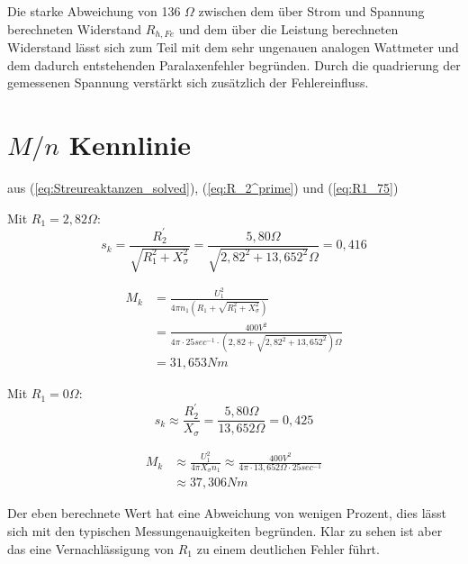 \documentclass[conference]{IEEEtran}
\begin{document}
Die starke Abweichung von 136 $ \Omega$ zwischen dem über Strom und Spannung
berechneten Widerstand $R_{h, Fe}$ und dem über die Leistung berechneten
Widerstand lässt sich zum Teil mit dem sehr ungenauen analogen Wattmeter und
dem dadurch entstehenden Paralaxenfehler begründen. Durch die quadrierung der
gemessenen Spannung verstärkt sich zusätzlich der Fehlereinfluss.

\section{$M/n$ Kennlinie}

aus (\ref{eq:Streureaktanzen_solved}), (\ref{eq:R_2^prime}) und (\ref{eq:R1_75})

\smallskip
Mit $R_1 = 2,82\Omega$:
\begin{equation} \label{eq:s_k-mit-R_1}
    s_k = \frac{R_2^{\prime}}{\sqrt{R_{1}^{2} + X_{\sigma}^{2}}} = \frac{5,80\Omega}{\sqrt{2,82^2+13,652^2}\Omega} = 0,416
\end{equation}

\begin{align}
    M_{k} & = \frac{U_{1}^{2}}{4 \pi n_{1} \left(R_{1} + \sqrt{R_{1}^{2} + X_{\sigma}^{2}}\right)}           \\
          & = \frac{400\si{V}^{2}}{4 \pi \cdot 25 \si{sec^{-1}} \cdot (2,82 + \sqrt{2,82^2+13,652^2})\Omega} \\
          & = 31,653 \si{Nm}
    \label{eq:M_k-mit-R_1}
\end{align}

\smallskip
Mit $R_1 = 0\Omega$:
\begin{equation} \label{eq:s_k-naehrung}
    s_k \approx \frac{R_2^{\prime}}{X_{\sigma}} = \frac{5,80\Omega}{13,652\Omega} = 0,425
\end{equation}

\begin{align}
    M_{k} & \approx \frac{U_{1}^{2}}{4 \pi X_{\sigma} n_{1}} \approx \frac{400\si{V}^{2}}{4 \pi\cdot 13,652 \Omega \cdot 25 \si{sec^{-1}}} \\
          & \approx 37,306 \si{Nm}
    \label{eq:M_k-mit-R_1}
\end{align}




Der eben berechnete Wert hat eine Abweichung von wenigen Prozent, dies lässt
sich mit den typischen Messungenauigkeiten begründen. Klar zu sehen ist aber
das eine Vernachlässigung von $R_{1}$ zu einem deutlichen Fehler führt.
\end{document}
